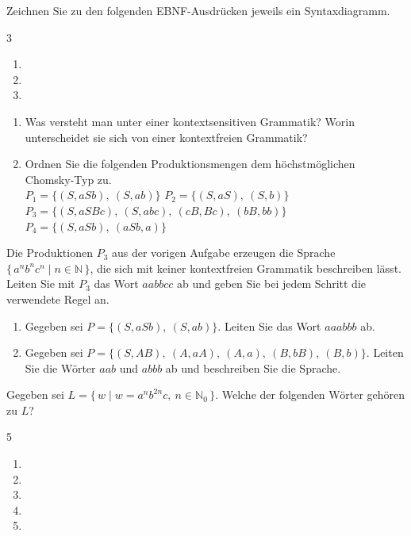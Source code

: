Zeichnen Sie zu den folgenden EBNF-Ausdrücken jeweils ein Syntaxdiagramm.
\begin{multicols}{3}
\begin{enumerate}[label=\alph*)]
\item {}
\item {}
\item {}
\end{enumerate}
\end{multicols}

\begin{enumerate}[label=\alph*)]
\item Was versteht man unter einer kontextsensitiven Grammatik? Worin unterscheidet sie sich von einer kontextfreien Grammatik?
\item Ordnen Sie die folgenden Produktionsmengen dem höchstmöglichen Chomsky-Typ zu. \\
$P_1 = \{(S, aSb),\ (S, ab)\}$ \qquad $P_2 = \{(S, aS),\ (S, b)\}$ \\
$P_3 = \{(S, aSBc),\ (S, abc),\ (cB, Bc),\ (bB, bb)\}$ \qquad $P_4 = \{(S, aSb),\ (aSb, a)\}$
\end{enumerate}

Die Produktionen $P_3$ aus der vorigen Aufgabe erzeugen die Sprache $\{\, a^n b^n c^n \mid n \in \mathbb{N} \,\}$, die sich mit keiner kontextfreien Grammatik beschreiben lässt. Leiten Sie mit $P_3$ das Wort $aabbcc$ ab und geben Sie bei jedem Schritt die verwendete Regel an.

\ueben
{}
\begin{enumerate}[label=\alph*)]
\item Gegeben sei $P = \{(S, aSb),\ (S, ab)\}$. Leiten Sie das Wort $aaabbb$ ab.
\item Gegeben sei $P = \{(S, AB),\ (A, aA),\ (A, a),\ (B, bB),\ (B, b)\}$. Leiten Sie die Wörter $aab$ und $abbb$ ab und beschreiben Sie die Sprache.
\end{enumerate}

Gegeben sei $L = \{\, w \mid w = a^{n} b^{2n} c,\ n \in \mathbb{N}_0 \,\}$. Welche der folgenden Wörter gehören zu $L$?
\begin{multicols}{5}
\begin{enumerate}[label=\alph*)]
\item {}
\item {}
\item {}
\item {}
\item {}
\end{enumerate}
\end{multicols}

